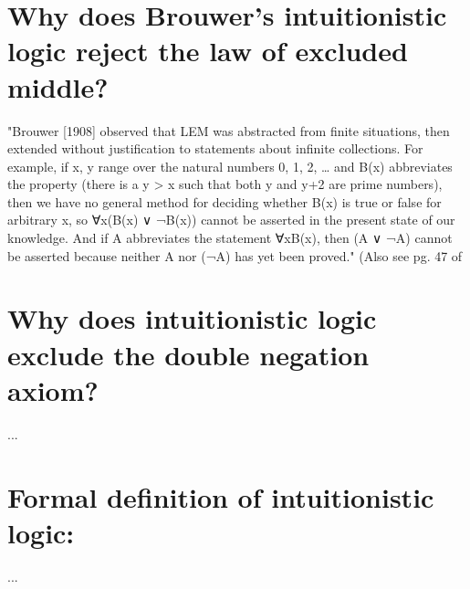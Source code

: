 \section{Why does Brouwer's intuitionistic logic reject the law of excluded middle?}
"Brouwer [1908] observed that LEM was abstracted from finite situations, then extended without justification to statements about infinite collections. For example, if x, y range over the natural numbers 0, 1, 2, … and B(x) abbreviates the property (there is a y > x such that both y and y+2 are prime numbers), then we have no general method for deciding whether B(x) is true or false for arbitrary x, so ∀x(B(x) ∨ ¬B(x)) cannot be asserted in the present state of our knowledge. And if A abbreviates the statement ∀xB(x), then (A ∨ ¬A) cannot be asserted because neither A nor (¬A) has yet been proved." \cite{stanfordLogic} (Also see pg. 47 of \cite{metamath}

\section{Why does intuitionistic logic exclude the double negation axiom?}
...

\section{Formal definition of intuitionistic logic:}
...

